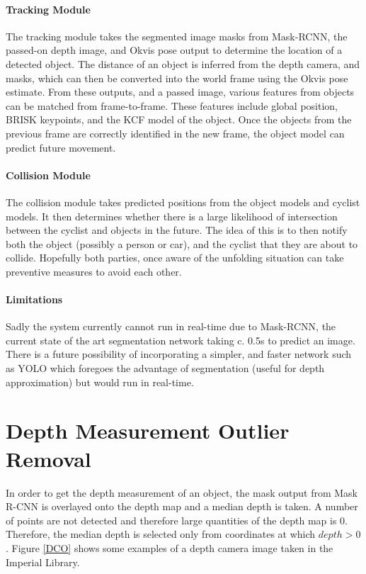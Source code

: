 \documentclass[11pt,twoside]{report}
\begin{document}
\paragraph{Tracking Module}

The tracking module takes the segmented image masks from Mask-RCNN, the passed-on depth image, and Okvis pose output to determine the location of a detected object. The distance of an object is inferred from the depth camera, and masks, which can then be converted into the world frame using the Okvis pose estimate. From these outputs, and a passed image, various features from objects can be matched from frame-to-frame. These features include global position, BRISK keypoints, and the KCF model of the object. Once the objects from the previous frame are correctly identified in the new frame, the object model can predict future movement.

\paragraph{Collision Module}
The collision module takes predicted positions from the object models and cyclist models. It then determines whether there is a large likelihood of intersection between the cyclist and objects in the future. The idea of this is to then notify both the object (possibly a person or car), and the cyclist that they are about to collide. Hopefully both parties, once aware of the unfolding situation can take preventive measures to avoid each other.

\paragraph{Limitations}
Sadly the system currently cannot run in real-time due to Mask-RCNN, the current state of the art segmentation network taking c. 0.5s to predict an image. There is a future possibility of incorporating a simpler, and faster network such as YOLO which foregoes the advantage of segmentation (useful for depth approximation) but would run in real-time.


\section{Depth Measurement Outlier Removal} \label{Depth_approx}

In order to get the depth measurement of an object, the mask output from Mask R-CNN is overlayed onto the depth map and a median depth is taken. A number of points are not detected and therefore large quantities of the depth map is 0. Therefore, the median depth is selected only from coordinates at which $depth>0$. Figure \ref{DCO} shows some examples of a depth camera image taken in the Imperial Library.
\end{document}
